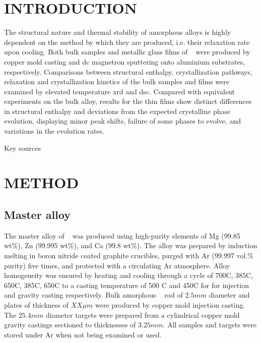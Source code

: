 \documentclass[a4paper,12pt,oneside]{article}%
\begin{document}
\newpage
\tableofcontents\newpage
{}
\clearpage %


\section{INTRODUCTION}
\glsresetall

The structural nature and thermal stability of amorphous alloys is highly dependent on the method by which they are produced, i.e. their relaxation rate upon cooling.  Both bulk samples and metallic glass films of \MgZnCa~ were produced by copper mold casting and \gls{dc} magnetron sputtering onto aluminium substrates, respectively. Comparisons between structural enthalpy, crystallization pathways, relaxation and crystallization kinetics of the bulk samples and films were examined by elevated temperature \acrshort{xrd} and \acrshort{dsc}. Compared with equivalent experiments on the bulk alloy, results for the thin films show distinct differences in structural enthalpy and deviations from the expected crystalline phase evolution, displaying minor peak shifts, failure of some phases to evolve, and variations in the evolution rates. 

Key sources \cite{Zhang2013, Zhang2012} 
\cite{Zhang2011}


\section{METHOD}

\subsection{Master alloy}
The master alloy of \MgZnCa~ was produced using high-purity elements of Mg (99.85 wt\%), Zn (99.995 wt\%), and Ca (99.8 wt\%). The alloy was prepared by induction melting in boron nitride coated graphite crucibles, purged with Ar (99.997 vol.\% purity) five times, and protected with a circulating Ar atmosphere. Alloy homogeneity was ensured by heating and cooling through a cycle of 700\degree C, 385\degree C, 650\degree C, 385\degree C, 650\degree C to a casting temperature of 500 \degree C and 450\degree C for for injection and gravity casting respectively. Bulk amorphous \MgZnCa~ rod of $2.5 mm$ diameter and plates of thickness of $XX \mu m$ were produced by copper mold injection casting. The $25.4 mm$ diameter targets were prepared from a cylindrical copper mold gravity castings sectioned to thicknesses of $3.25 mm$. All samples and targets were stored under Ar when not being examined or used. 
\end{document}
